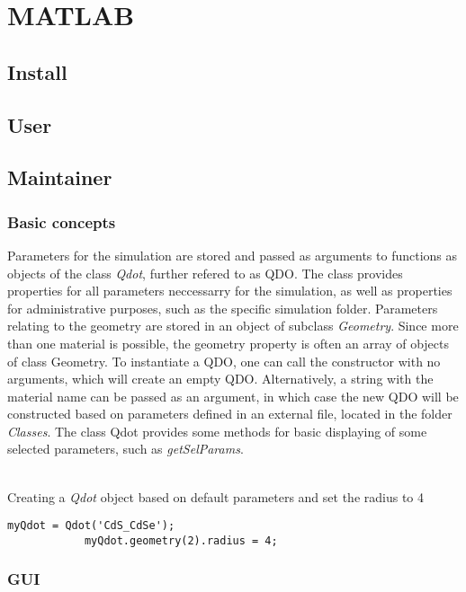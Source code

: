 \chapter{MATLAB}
\section{Install}
\section{User}
\section{Maintainer}
\subsection{Basic concepts}
	Parameters for the simulation are stored and passed as arguments to functions as objects of the class \textit{Qdot}, further refered to as QDO. 
	The class provides properties for all parameters neccessarry for the simulation, as well as properties for administrative purposes, such as the 
	specific simulation folder. Parameters relating to the geometry are stored in an object of subclass \textit{Geometry}. Since more than one material 
	is possible, the geometry property is often an array of objects of class Geometry. 
	To instantiate a QDO, one can call the constructor with no arguments, which will create an empty QDO. Alternatively, a string with the material 
	name can be passed as an argument, in which case the new QDO will be constructed based on parameters defined in an external file, located 
	in the folder \textit{Classes}.
	The class Qdot provides some methods for basic displaying of some selected parameters, such as \textit{getSelParams}.\\\\
	\begin{EXAMPLE}
		Creating a \textit{Qdot} object based on default parameters and set the radius to 4
		\begin{lstlisting}[frame=none]
			myQdot = Qdot('CdS_CdSe');
			myQdot.geometry(2).radius = 4;
		\end{lstlisting}
	\end{EXAMPLE}
\subsection{GUI}
